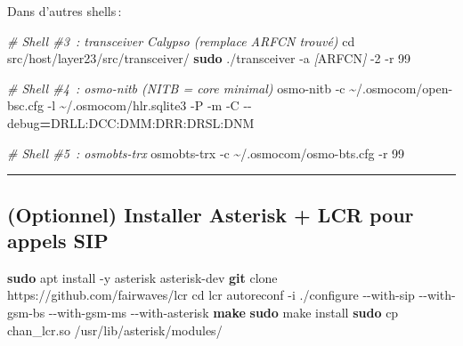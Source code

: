 \documentclass[
]{article}
\newenvironment{Shaded}{\begin{snugshade}}{\end{snugshade}}
\newcommand{\AttributeTok}[1]{\textcolor[rgb]{0.13,0.29,0.53}{#1}}
\newcommand{\BuiltInTok}[1]{#1}
\newcommand{\CommentTok}[1]{\textcolor[rgb]{0.56,0.35,0.01}{\textit{#1}}}
\newcommand{\ExtensionTok}[1]{#1}
\newcommand{\FunctionTok}[1]{\textcolor[rgb]{0.13,0.29,0.53}{\textbf{#1}}}
\newcommand{\NormalTok}[1]{#1}
\newcommand{\OperatorTok}[1]{\textcolor[rgb]{0.81,0.36,0.00}{\textbf{#1}}}
\newcommand{\PreprocessorTok}[1]{\textcolor[rgb]{0.56,0.35,0.01}{\textit{#1}}}
\newcommand{\SpecialStringTok}[1]{\textcolor[rgb]{0.31,0.60,0.02}{#1}}
\begin{document}
Dans d'autres shells\,:

\begin{Shaded}
\begin{Highlighting}[]
\CommentTok{\# Shell \#3 : transceiver Calypso (remplace ARFCN trouvé)}
\BuiltInTok{cd}\NormalTok{ src/host/layer23/src/transceiver/}
\FunctionTok{sudo}\NormalTok{ ./transceiver }\AttributeTok{{-}a} \PreprocessorTok{[}\SpecialStringTok{ARFCN}\PreprocessorTok{]} \AttributeTok{{-}2} \AttributeTok{{-}r}\NormalTok{ 99}

\CommentTok{\# Shell \#4 : osmo{-}nitb (NITB = core minimal)}
\ExtensionTok{osmo{-}nitb} \AttributeTok{{-}c}\NormalTok{ \textasciitilde{}/.osmocom/open{-}bsc.cfg }\AttributeTok{{-}l}\NormalTok{ \textasciitilde{}/.osmocom/hlr.sqlite3 }\AttributeTok{{-}P} \AttributeTok{{-}m} \AttributeTok{{-}C} \AttributeTok{{-}{-}debug}\OperatorTok{=}\NormalTok{DRLL:DCC:DMM:DRR:DRSL:DNM}

\CommentTok{\# Shell \#5 : osmobts{-}trx}
\ExtensionTok{osmobts{-}trx} \AttributeTok{{-}c}\NormalTok{ \textasciitilde{}/.osmocom/osmo{-}bts.cfg }\AttributeTok{{-}r}\NormalTok{ 99}
\end{Highlighting}
\end{Shaded}

\begin{center}\rule{0.5\linewidth}{0.5pt}\end{center}

\subsection{(Optionnel) Installer Asterisk + LCR pour appels
SIP}\label{optionnel-installer-asterisk-lcr-pour-appels-sip}

\begin{Shaded}
\begin{Highlighting}[]
\FunctionTok{sudo}\NormalTok{ apt install }\AttributeTok{{-}y}\NormalTok{ asterisk asterisk{-}dev}
\FunctionTok{git}\NormalTok{ clone https://github.com/fairwaves/lcr}
\BuiltInTok{cd}\NormalTok{ lcr}
\ExtensionTok{autoreconf} \AttributeTok{{-}i}
\ExtensionTok{./configure} \AttributeTok{{-}{-}with{-}sip} \AttributeTok{{-}{-}with{-}gsm{-}bs} \AttributeTok{{-}{-}with{-}gsm{-}ms} \AttributeTok{{-}{-}with{-}asterisk}
\FunctionTok{make}
\FunctionTok{sudo}\NormalTok{ make install}
\FunctionTok{sudo}\NormalTok{ cp chan\_lcr.so /usr/lib/asterisk/modules/}
\end{Highlighting}
\end{Shaded}
\end{document}
